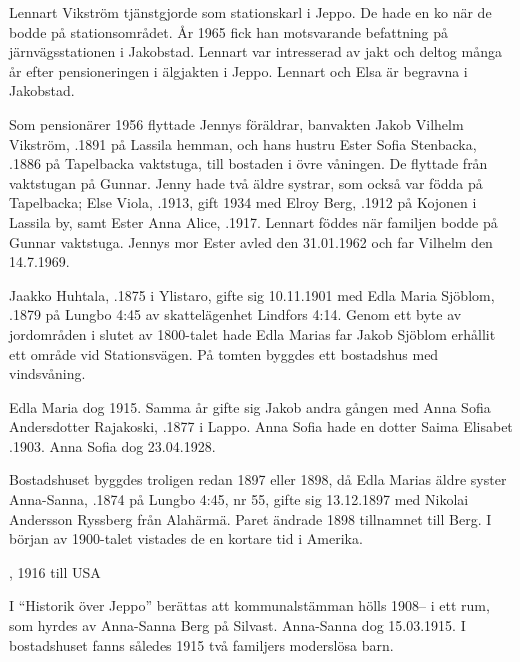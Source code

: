 Lennart Vikström tjänstgjorde som stationskarl i Jeppo. De hade en ko	när de bodde på stationsområdet. År 1965 fick han motsvarande	befattning på järnvägsstationen i Jakobstad. Lennart var intresserad av	jakt och deltog många år efter pensioneringen i älgjakten i Jeppo.	Lennart och Elsa är begravna i Jakobstad.

Som pensionärer 1956 flyttade Jennys föräldrar, banvakten Jakob	Vilhelm Vikström, .1891 på Lassila hemman, och	hans hustru Ester Sofia Stenbacka, .1886 på Tapelbacka	vaktstuga, till bostaden i övre våningen. De flyttade från vaktstugan på	Gunnar. Jenny hade två äldre systrar, som också var födda på Tapelbacka; Else Viola, .1913, gift 1934 med Elroy Berg, .1912 på Kojonen i Lassila by, samt Ester Anna Alice, .1917.	Lennart föddes när familjen bodde på Gunnar vaktstuga. Jennys mor Ester avled den 31.01.1962 och far Vilhelm den 14.7.1969.


Jaakko Huhtala, .1875 i Ylistaro, gifte sig 10.11.1901 med Edla Maria Sjöblom, .1879 på Lungbo 4:45 av skattelägenhet Lindfors 4:14. Genom ett byte av jordområden i slutet av 1800-talet hade Edla Marias far Jakob Sjöblom erhållit ett område vid Stationsvägen. På tomten byggdes ett bostadshus med vindsvåning.
\begin{jhchildren}
  \item {}
  \item {}
  \item {}
  \item {}
  \item {}
\end{jhchildren}
Edla Maria dog 1915. Samma år gifte sig Jakob andra gången med Anna Sofia Andersdotter Rajakoski, .1877 i Lappo. Anna Sofia hade en dotter Saima Elisabet .1903. Anna Sofia dog 23.04.1928.


Bostadshuset byggdes troligen redan 1897 eller 1898, då Edla Marias äldre syster Anna-Sanna, .1874 på Lungbo 4:45, nr 55,	gifte sig 13.12.1897 med Nikolai Andersson Ryssberg från Alahärmä.	Paret ändrade 1898 tillnamnet till Berg. I början av 1900-talet vistades de en kortare tid i Amerika.
\begin{jhchildren}
  \item {}, 1916 till USA
  \item {}
  \item {}
  \item {}
\end{jhchildren}
I ``Historik över Jeppo'' berättas att kommunalstämman hölls 1908-- i ett rum, som hyrdes av Anna-Sanna Berg på Silvast. Anna-Sanna dog 15.03.1915. I bostadshuset fanns således 1915 två familjers moderslösa barn.

